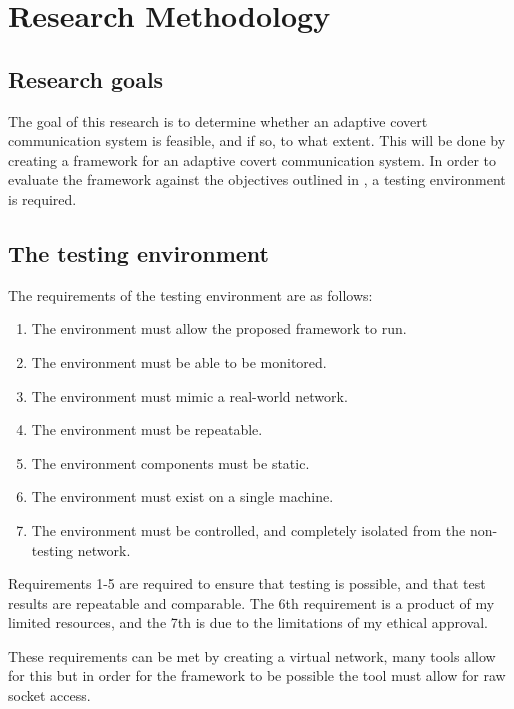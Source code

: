 \chapter{Research Methodology}

\section{Research goals}

The goal of this research is to determine whether an adaptive covert communication system is feasible, and if so, to what extent. This will be done by creating a framework for an adaptive covert communication system.
In order to evaluate the framework against the objectives outlined in , a testing environment is required.

\section{The testing environment}
\label{sec:testing_environment}

The requirements of the testing environment are as follows:

\begin{enumerate}
    \item The environment must allow the proposed framework to run.  %
    \item The environment must be able to be monitored. %
    \item The environment must mimic a real-world network. %
    \item The environment must be repeatable. %
    \item The environment components must be static. %
    \item The environment must exist on a single machine. %
    \item The environment must be controlled, and completely isolated from the non-testing network. %
\end{enumerate}

Requirements 1-5 are required to ensure that testing is possible, and that test results are repeatable and comparable. The 6th requirement is a product of my limited resources, and the 7th is due to the limitations of my ethical approval.

These requirements can be met by creating a virtual network, many tools allow for this but in order for the framework to be possible the tool must allow for raw socket access.

